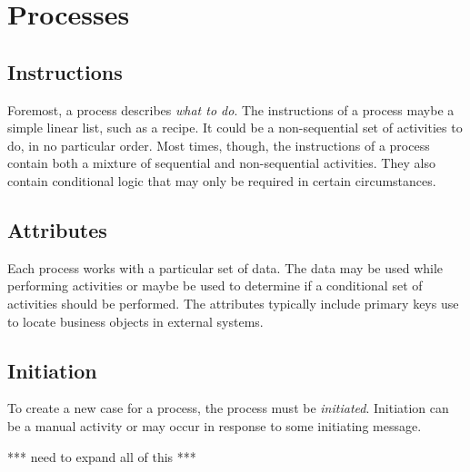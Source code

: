 \chapter{Processes}

\section{Instructions}

Foremost, a process describes \emph{what to do}.  The
instructions of a process maybe a simple linear list, such as
a recipe.  It could be a non-sequential set of activities to
do, in no particular order.  Most times, though, the instructions
of a process contain both a mixture of sequential and non-sequential
activities.  They also contain conditional logic that may
only be required in certain circumstances.

\section{Attributes}

Each process works with a particular set of data.  The data
may be used while performing activities or maybe be used to 
determine if a conditional set of activities should be
performed.  The attributes typically include primary keys
use to locate business objects in external systems.

\section{Initiation}

To create a new case for a process, the process must be
\emph{initiated}.  Initiation can be a manual activity
or may occur in response to some initiating message.

*** need to expand all of this ***


